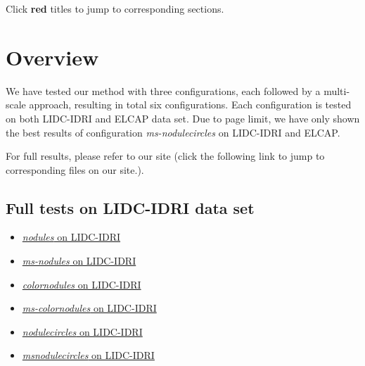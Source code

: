 \documentclass[onecolumn]{IEEEtran}
\begin{document}
\tableofcontents

\large{Click \textbf{red} titles to jump to corresponding sections. }
\newpage


\section{Overview}
We have tested our method with three configurations, each followed by a multi-scale approach, resulting in total six configurations. Each configuration is tested on both LIDC-IDRI and ELCAP data set. Due to page limit, we have only shown the best results of configuration \emph{ms-nodulecircles} on LIDC-IDRI and ELCAP. 

For full results, please refer to our site (click the following link to jump to corresponding files on our site.).

\subsection{Full tests on LIDC-IDRI data set}
\begin{itemize}
\item \href{http://liu3xing3long.github.io/}{\emph{nodules} on LIDC-IDRI}

\item \href{http://liu3xing3long.github.io/}{\emph{ms-nodules} on LIDC-IDRI}

\item \href{http://liu3xing3long.github.io/}{\emph{colornodules} on LIDC-IDRI}

\item \href{http://liu3xing3long.github.io/}{\emph{ms-colornodules} on LIDC-IDRI}

\item \href{http://liu3xing3long.github.io/}{\emph{nodulecircles} on LIDC-IDRI}

\item \href{http://liu3xing3long.github.io/}{\emph{msnodulecircles} on LIDC-IDRI}
\end{itemize}
\end{document}
